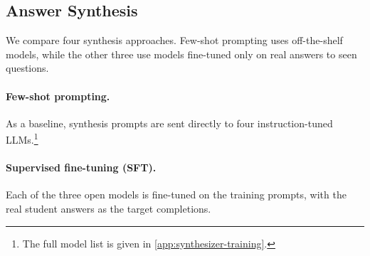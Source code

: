 \subsection{Answer Synthesis}
\label{sec:answer-synthesis}

We compare four synthesis approaches. Few-shot prompting uses off-the-shelf models, while the other three use models fine-tuned only on real answers to seen questions.

\paragraph{Few-shot prompting.}
As a baseline, synthesis prompts are sent directly to four instruction-tuned LLMs.\footnote{The full model list is given in \autoref{app:synthesizer-training}.}

\paragraph{Supervised fine-tuning (SFT).}
Each of the three open models is fine-tuned on the training prompts, with the real student answers as the target completions.



